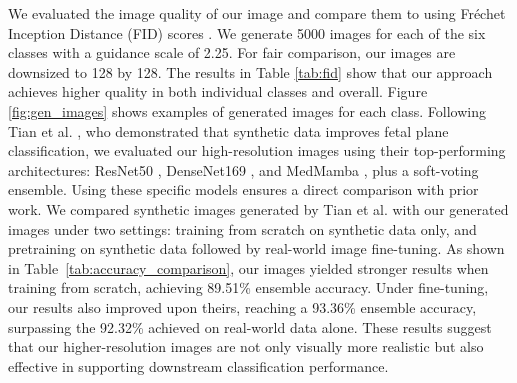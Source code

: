 \documentclass[runningheads]{llncs}
\begin{document}
We evaluated the image quality of our image and compare them to \cite{tian2025enhancing} using Fréchet Inception Distance (FID) scores \cite{heusel2017gans}. We generate 5000 images for each of the six classes with a guidance scale of 2.25. For fair comparison, our images are downsized to 128 by 128. The results in Table \ref{tab:fid} show that our approach achieves higher quality in both individual classes and overall. Figure \ref{fig:gen_images} shows examples of generated images for each class.
Following Tian et al. \cite{tian2025enhancing}, who demonstrated that synthetic data improves fetal plane classification, we evaluated our high-resolution images using their top-performing architectures: ResNet50 \cite{he2016deep}, DenseNet169 \cite{huang2017densely}, and MedMamba \cite{yue2024medmamba}, plus a soft-voting ensemble. Using these specific models ensures a direct comparison with prior work.
We compared synthetic images generated by Tian et al. with our generated images under two settings: training from scratch on synthetic data only, and pretraining on synthetic data followed by real-world image fine-tuning. As shown in Table~\ref{tab:accuracy_comparison}, our images yielded stronger results when training from scratch, achieving 89.51\% ensemble accuracy. Under fine-tuning, our results also improved upon theirs, reaching a 93.36\% ensemble accuracy, surpassing the 92.32\% achieved on real-world data alone. These results suggest that our higher-resolution images are not only visually more realistic but also effective in supporting downstream classification performance.
\end{document}
